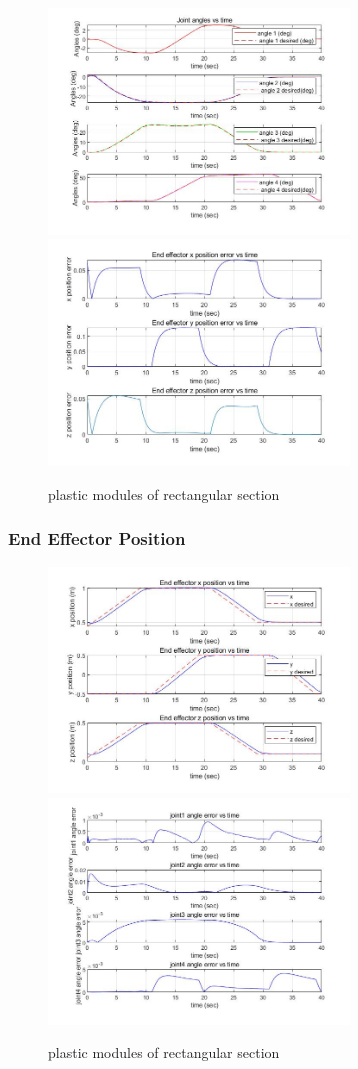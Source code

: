 \begin{figure}[htbp]
    \centering
    \includegraphics[width=8cm]{./fig/4.jpg}
    \includegraphics[width=8cm]{./fig/6.jpg}
    \caption{plastic modules of rectangular section}
    \label{f1}
\end{figure}

\subsubsection*{End Effector Position}

\begin{figure}[htbp]
    \centering
    \includegraphics[width=8cm]{./fig/5.jpg}
    \includegraphics[width=8cm]{./fig/7.jpg}
    \caption{plastic modules of rectangular section}
    \label{f1}
\end{figure}
